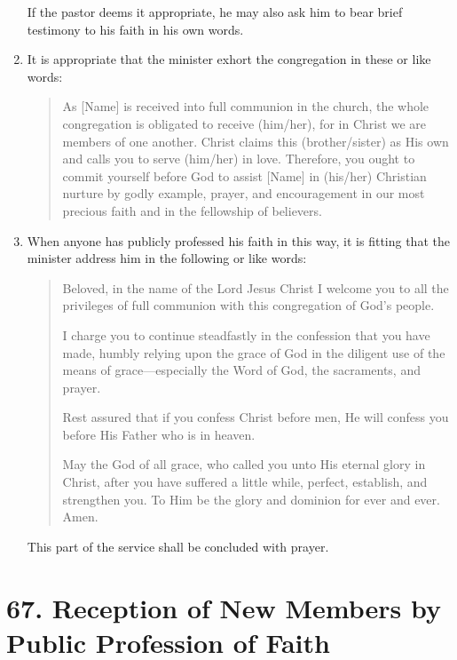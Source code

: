 \documentclass[
]{book}
\begin{document}
\begin{enumerate}
  If the pastor deems it appropriate, he may also ask him to bear brief testimony to his faith in his own words.
\item
  It is appropriate that the minister exhort the congregation in these or like words:

  \begin{quote}
  As {[}Name{]} is received into full communion in the church, the whole congregation is obligated to receive (him/her), for in Christ we are members of one another. Christ claims this (brother/sister) as His own and calls you to serve (him/her) in love. Therefore, you ought to commit yourself before God to assist {[}Name{]} in (his/her) Christian nurture by godly example, prayer, and encouragement in our most precious faith and in the fellowship of believers.
  \end{quote}
\item
  When anyone has publicly professed his faith in this way, it is fitting that the minister address him in the following or like words:

  \begin{quote}
  Beloved, in the name of the Lord Jesus Christ I welcome you to all the privileges of full communion with this congregation of God's people.

  I charge you to continue steadfastly in the confession that you have made, humbly relying upon the grace of God in the diligent use of the means of grace---especially the Word of God, the sacraments, and prayer.

  Rest assured that if you confess Christ before men, He will confess you before His Father who is in heaven.

  May the God of all grace, who called you unto His eternal glory in Christ, after you have suffered a little while, perfect, establish, and strengthen you. To Him be the glory and dominion for ever and ever. Amen.
  \end{quote}

  This part of the service shall be concluded with prayer.
\end{enumerate}

\hypertarget{reception-of-new-members-by-public-profession-of-faith}{%
\section*{67. Reception of New Members by Public Profession of Faith}\label{reception-of-new-members-by-public-profession-of-faith}}
\end{document}
